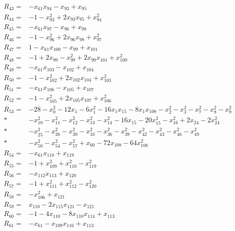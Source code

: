 \begin{align*}
R_{43}={}&-x_{61}x_{94}-x_{93}+x_{95}\\[3pt]
R_{44}={}&-1-x_{93}^{2}+2x_{93}x_{95}+x_{94}^{2}\\[3pt]
R_{45}={}&-x_{61}x_{97}-x_{96}+x_{98}\\[3pt]
R_{46}={}&-1-x_{96}^{2}+2x_{96}x_{98}+x_{97}^{2}\\[3pt]
R_{47}={}&1-x_{61}x_{100}-x_{99}+x_{101}\\[3pt]
R_{48}={}&-1+2x_{99}-x_{99}^{2}+2x_{99}x_{101}+x_{100}^{2}\\[3pt]
R_{49}={}&-x_{61}x_{103}-x_{102}+x_{104}\\[3pt]
R_{50}={}&-1-x_{102}^{2}+2x_{102}x_{104}+x_{103}^{2}\\[3pt]
R_{51}={}&-x_{61}x_{106}-x_{105}+x_{107}\\[3pt]
R_{52}={}&-1-x_{105}^{2}+2x_{105}x_{107}+x_{106}^{2}\\[3pt]
R_{53}={}&-28-x_{0}^{2}-12x_{1}-6x_{1}^{2}-16x_{1}x_{15}-8x_{1}x_{108}-x_{2}^{2}-x_{3}^{2}-x_{7}^{2}-x_{8}^{2}-x_{9}^{2}\\*
&-x_{10}^{2}-x_{11}^{2}-x_{12}^{2}-x_{13}^{2}-x_{14}^{2}-16x_{15}-20x_{15}^{2}-x_{16}^{2}+2x_{24}-2x_{24}^{2}\\*
&-x_{25}^{2}-x_{26}^{2}-x_{30}^{2}-x_{33}^{2}-x_{36}^{2}-x_{39}^{2}-x_{42}^{2}-x_{43}^{2}-x_{46}^{2}-x_{49}^{2}\\*
&-x_{50}^{2}-x_{54}^{2}-x_{57}^{2}+x_{60}-72x_{108}-64x_{108}^{2}\\[3pt]
R_{54}={}&-x_{61}x_{110}+x_{119}\\[3pt]
R_{55}={}&-1+x_{109}^{2}+x_{110}^{2}-x_{119}^{2}\\[3pt]
R_{56}={}&-x_{112}x_{113}+x_{120}\\[3pt]
R_{57}={}&-1+x_{111}^{2}+x_{112}^{2}-x_{120}^{2}\\[3pt]
R_{58}={}&-x_{106}^{2}+x_{121}\\[3pt]
R_{59}={}&x_{110}-2x_{115}x_{121}-x_{121}\\[3pt]
R_{60}={}&-1-4x_{110}-8x_{110}x_{114}+x_{113}\\[3pt]
R_{61}={}&-x_{61}-x_{109}x_{116}+x_{113}\\[3pt]

\end{align*}
